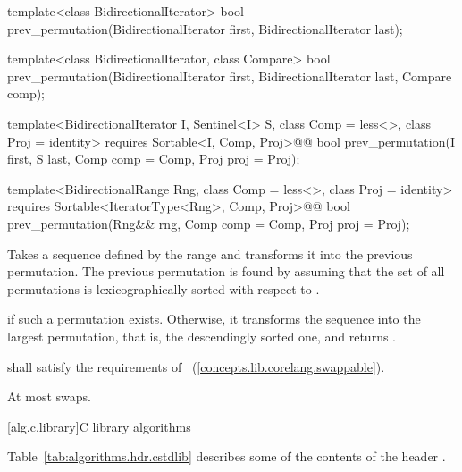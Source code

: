 %
\begin{removedblock}
\begin{itemdecl}
template<class BidirectionalIterator>
  bool prev_permutation(BidirectionalIterator first,
                        BidirectionalIterator last);

template<class BidirectionalIterator, class Compare>
  bool prev_permutation(BidirectionalIterator first,
                        BidirectionalIterator last, Compare comp);
\end{itemdecl}
\end{removedblock}
\begin{addedblock}
\begin{itemdecl}
template<BidirectionalIterator I, Sentinel<I> S, class Comp = less<>,
    class Proj = identity>
  requires Sortable<I, Comp, Proj>@\newtxt{()}@
  bool prev_permutation(I first, S last, Comp comp = Comp{}, Proj proj = Proj{});

template<BidirectionalRange Rng, class Comp = less<>,
    class Proj = identity>
  requires Sortable<IteratorType<Rng>, Comp, Proj>@\newtxt{()}@
  bool
    prev_permutation(Rng&& rng, Comp comp = Comp{}, Proj proj = Proj{});
\end{itemdecl}
\end{addedblock}

\begin{itemdescr}
\pnum
\effects
Takes a sequence defined by the range
and transforms it into the previous permutation.
The previous permutation is found by assuming that the set of all permutations is
lexicographically sorted with respect to
 .

\pnum
\returns
{}
if such a permutation exists.
Otherwise, it transforms the sequence into the largest permutation,
that is, the descendingly sorted one, and returns
.

\begin{removedblock}
\pnum
\requires
{} shall satisfy the requirements of
~(\ref{concepts.lib.corelang.swappable}).
\end{removedblock}

\pnum
\complexity
At most
swaps.
\end{itemdescr}

[alg.c.library]{C library algorithms}

\pnum
Table~\ref{tab:algorithms.hdr.cstdlib} describes some of the contents of the header .


